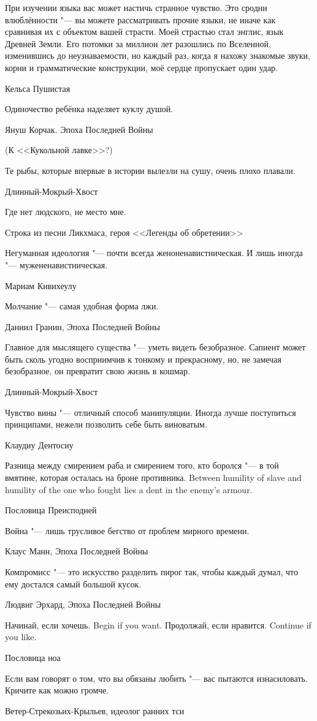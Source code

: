 \epigraph
{При изучении языка вас может настичь странное чувство.
Это сродни влюблённости "--- вы можете рассматривать прочие языки, не иначе как сравнивая их с объектом вашей страсти.
Моей страстью стал энглис, язык Древней Земли.
Его потомки за миллион лет разошлись по Вселенной, изменившись до неузнаваемости, но каждый раз, когда я нахожу знакомые звуки, корни и грамматические конструкции, моё сердце пропускает один удар.}
{Кельса Пушистая}

\epigraph
{Одиночество ребёнка наделяет куклу душой.}
{Януш Корчак.
Эпоха Последней Войны}
(К <<Кукольной лавке>>?)

\epigraph{Те рыбы, которые впервые в истории вылезли на сушу, очень плохо плавали.}
{Длинный-Мокрый-Хвост}

\epigraph
{Где нет людского, не место мне.}
{Строка из песни Ликхмаса, героя <<Легенды об обретении>>}

\epigraph
{Негуманная идеология "--- почти всегда женоненавистническая.
И лишь иногда "--- мужененавистническая.}
{Мариам Кивихеулу}

\epigraph
{Молчание "--- самая удобная форма лжи.}
{Даниил Гранин, Эпоха Последней Войны}

\epigraph
{Главное для мыслящего существа "--- уметь видеть безобразное.
Сапиент может быть сколь угодно восприимчив к тонкому и прекрасному, но, не замечая безобразное, он превратит свою жизнь в кошмар.}
{Длинный-Мокрый-Хвост}

\epigraph
{Чувство вины "--- отличный способ манипуляции.
Иногда лучше поступиться принципами, нежели позволить себе быть виноватым.}
{Клаудиу Дентосиу}

\epigraph{
{Разница между смирением раба и смирением того, кто боролся "--- в той вмятине, которая осталась на броне противника.}
{Between humility of slave and humility of the one who fought lies a dent in the enemy's armour.}
}{Пословица Преисподней}

\epigraph
{Война "--- лишь трусливое бегство от проблем мирного времени.}
{Клаус Манн, Эпоха Последней Войны}

\epigraph
{Компромисс "--- это искусство разделить пирог так, чтобы каждый думал, что ему достался самый большой кусок.}
{Людвиг Эрхард, Эпоха Последней Войны}

\epigraph{
{Начинай, если хочешь.}
{Begin if you want.}
{Продолжай, если нравится.}
{Continue if you like.}
}{Пословица ноа}

\epigraph
{Если вам говорят о том, что вы обязаны любить "--- вас пытаются изнасиловать.
Кричите как можно громче.}
{Ветер-Стрекозьих-Крыльев, идеолог ранних тси}

